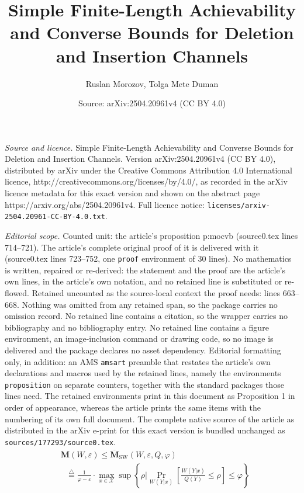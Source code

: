 \documentclass[10pt,a4paper]{amsart}
\title{Simple Finite-Length Achievability and Converse Bounds for Deletion and Insertion Channels}
\author{Ruslan Morozov, Tolga Mete Duman}
\date{Source: arXiv:2504.20961v4 (CC BY 4.0)}
\newcommand{\bfM}{{\mathbf{M}}}
\newcommand{\brsq}[1]{{\left[{#1}\right]}}
\newcommand{\defeq}{{\overset{\triangle}{=}}}
\newcommand{\mX}{{\mathcal{X}}}
\newcommand{\obfM}{{\overline{\mathbf{M}}}}
\newcommand{\set}[1]{{\left\{{#1}\right\}}}
\newcommand{\ve}{\varepsilon}
\newcommand{\vp}{\varphi}
\begin{document}
\maketitle

\noindent\emph{Source and licence.} Simple Finite-Length Achievability and Converse Bounds for Deletion and Insertion Channels. Version arXiv:2504.20961v4 (CC BY 4.0), distributed by arXiv under the Creative Commons Attribution 4.0 International licence, http://creativecommons.org/licenses/by/4.0/, as recorded in the arXiv licence metadata for this exact version and shown on the abstract page https://arxiv.org/abs/2504.20961v4. Full licence notice: \texttt{licenses/arxiv-2504.20961-CC-BY-4.0.txt}.\par\smallskip

\noindent\textit{Editorial scope.} Counted unit: the article's proposition p:mocvb (source0.tex lines 714--721). The article's complete original proof of it is delivered with it (source0.tex lines 723--752, one \texttt{proof} environment of 30 lines). No mathematics is written, repaired or re-derived: the statement and the proof are the article's own lines, in the article's own notation, and no retained line is substituted or re-flowed.  Retained uncounted as the source-local context the proof needs: lines 663--668.  Nothing was omitted from any retained span, so the package carries no omission record.  No retained line contains a citation, so the wrapper carries no bibliography and no bibliography entry.  No retained line contains a figure environment, an image-inclusion command or drawing code, so no image is delivered and the package declares no asset dependency.  Editorial formatting only, in addition: an AMS \texttt{amsart} preamble that restates the article's own declarations and macros used by the retained lines, namely the environments \texttt{proposition} on separate counters, together with the standard packages those lines need.  The retained environments print in this document as Proposition 1 in order of appearance, whereas the article prints the same items with the numbering of its own full document.  The complete native source of the article as distributed in the arXiv e-print for this exact version is bundled unchanged as \texttt{sources/177293/source0.tex}.
\begin{align}
&\bfM(W,\ve) \leq \obfM_{\text{SW}}(W,\ve,Q,\vp)
\nonumber \\&
\ \ \ \defeq \frac{1}{\vp - \ve} \cdot \max_{x\in\mX} \sup \set{\rho\bigg| \Pr_{W(Y|x)}\brsq{\frac{W(Y|x)}{Q(Y)}\leq \rho} \leq \vp}
\label{eq:cvb}
\end{align}
\end{document}

